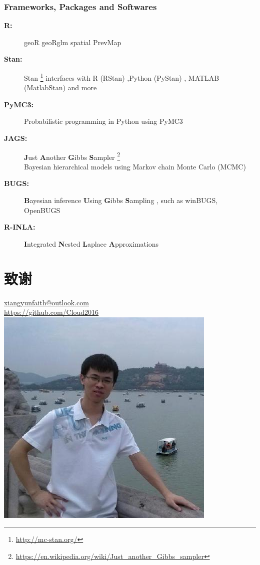 \documentclass[xcolor=x11names,UTF8]{ctexbeamer}
\begin{document}
\begin{frame}[allowframebreaks]
\frametitle{Frameworks, Packages and Softwares}

\begin{description}
\item[\textbf{R:}] geoR geoRglm spatial PrevMap \\
\citet{R-geoR,R-geoRglm,R-spatial,Giorgi2016}

\item[\textbf{Stan:}] Stan \footnote{\scriptsize \url{http://mc-stan.org/} }  
interfaces with R (RStan) ,Python (PyStan) , MATLAB (MatlabStan) 
and  more \\ \citet{Stan2015,Stan2017}

\item[\textbf{PyMC3:}] Probabilistic programming in Python using PyMC3 \\ \citet{Salvatier2016}

\item[\textbf{JAGS:}] \textbf{J}ust \textbf{A}nother \textbf{G}ibbs \textbf{S}ampler \footnote{\scriptsize \url{https://en.wikipedia.org/wiki/Just_another_Gibbs_sampler}} \\
Bayesian hierarchical models using Markov chain Monte Carlo (MCMC)
\item[\textbf{BUGS:}] \textbf{B}ayesian inference \textbf{U}sing \textbf{G}ibbs \textbf{S}ampling ,
such as winBUGS, OpenBUGS 
\item[\textbf{R-INLA:}] \textbf{I}ntegrated \textbf{N}ested \textbf{L}aplace \textbf{A}pproximations \\
\citet{Rue2009,R-INLA,Rue2017arXiv}
\end{description}


\end{frame}

\section*{致谢}

\begin{frame}
\centering
\color{red}
\bigskip
\color{Blue4}
\normalsize
\href{mailto:me@somewhere.com}{xiangyunfaith@outlook.com} \\
\href{https://github.com/Cloud2016}{https://github.com/Cloud2016} \\
\bigskip
\includegraphics[width=10ex,interpolate=true]{me}
\end{frame}


\begin{frame}[allowframebreaks]


\end{frame}
\end{document}
